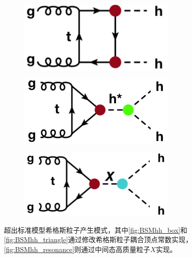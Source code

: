 \begin{figure}[h]
\centering
 \begin{subfigure}[b]{0.33\textwidth}
  \includegraphics[width=0.85\textwidth]{fig/BSM_hh1.png}
  \caption{}
  \label{fig:BSMhh_box}
  \label{fig:diagram_BSMhh_box}
 \end{subfigure}
 \begin{subfigure}[b]{0.33\textwidth}
  \includegraphics[width=0.85\textwidth]{fig/BSM_hh2.png}
  \caption{}
  \label{fig:BSMhh_triangle}
  \label{fig:diagram_BSMhh_triangle}
 \end{subfigure}
 \begin{subfigure}[b]{0.33\textwidth}
  \includegraphics[width=0.85\textwidth]{fig/BSM_hh3.png}
  \caption{}
  \label{fig:BSMhh_resonance}
 \label{fig:diagram_resonant_hh}
 \end{subfigure}
\caption{超出标准模型希格斯粒子产生模式，其中\ref{fig:BSMhh_box}和\ref{fig:BSMhh_triangle}通过修改希格斯粒子耦合顶点常数实现，\ref{fig:BSMhh_resonance}则通过中间态高质量粒子$X$实现。}
\label{fig:diagram_BSM_hh}
\end{figure}

